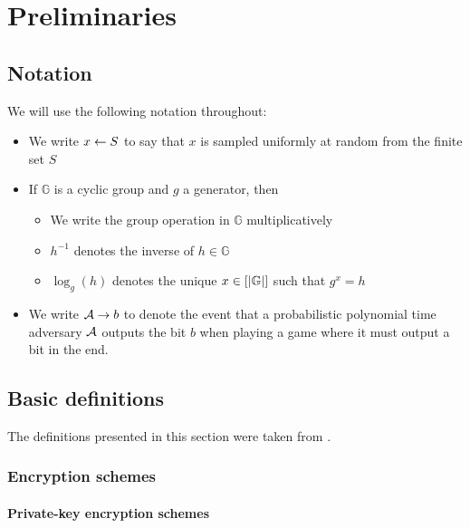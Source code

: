 \chapter{Preliminaries}

\section{Notation}

We will use the following notation throughout:
\begin{itemize}
	\item We write $x \leftarrow S$ to say that $x$ is sampled uniformly at random from the finite set $S$
	\item If $\mathbb{G}$ is a cyclic group and $g$ a generator, then
	      \begin{itemize}
		      \item We write the group operation in $\mathbb{G}$ multiplicatively
		      \item $h^{-1}$ denotes the inverse of $h \in \mathbb{G}$
		      \item $\log_g(h)$ denotes the unique $x \in [\lvert\mathbb{G}\rvert]$ such that $g^x = h$
	      \end{itemize}
	\item We write $\mathcal{A} \rightarrow b$ to denote the event that a probabilistic polynomial time adversary $\mathcal{A}$ outputs the bit $b$ when playing a game where it must output a bit in the end.
\end{itemize}


\section{Basic definitions}

The definitions presented in this section were taken from \cite{introduction-to-modern-cryptography}.

\subsection{Encryption schemes}

\subsubsection{Private-key encryption schemes}


